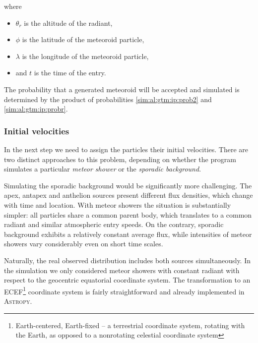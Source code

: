            where
            \begin{itemize}
                \item $\theta_r$ is the altitude of the radiant,
                \item $\phi$ is the latitude of the meteoroid particle,
                \item $\lambda$ is the longitude of the meteoroid particle,
                \item and $t$ is the time of the entry.
            \end{itemize}
            
            The probability that a generated meteoroid will be accepted and simulated
            is determined by the product of probabilities \ref{sim:al:gtm:ip:prob2} and \ref{sim:al:gtm:ip:probr}.           
           

        \subsubsection{Initial velocities} \label{sim:al:gm:iv}
            In the next step we need to assign the particles their initial velocities.
            There are two distinct approaches to this problem, depending on whether
            the program simulates a particular \emph{meteor shower} or the \emph{sporadic background}.
            
            Simulating the sporadic background would be significantly more challenging. The apex, antapex and anthelion
            sources present different flux densities, which change with time and location.
            With meteor showers the situation is substantially simpler: all particles share a common parent
            body, which translates to a common radiant and similar atmospheric entry speeds.
            On the contrary, sporadic background exhibits a relatively constant average flux,
            while intensities of meteor showers vary considerably even on short time scales.
            
            Naturally, the real observed distribution includes both sources simultaneously.
            In the simulation we only considered meteor showers with constant radiant
            with respect to the geocentric equatorial coordinate system.
            The transformation to an ECEF\footnote{Earth-centered, Earth-fixed -- a terrestrial coordinate system, rotating with the Earth,
            as opposed to a nonrotating celestial coordinate system} coordinate system is fairly straightforward
            and already implemented in \textsc{Astropy}.
                        
